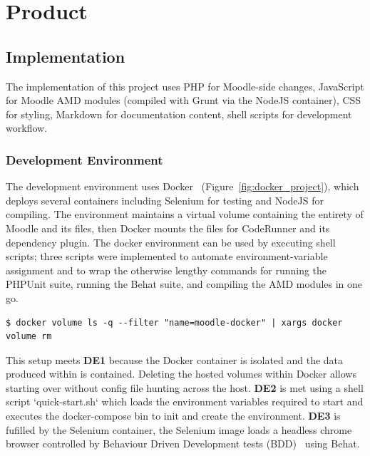 \section{Product}\label{product}

\subsection{Implementation}

The implementation of this project uses PHP for Moodle-side changes, JavaScript for Moodle AMD modules (compiled with Grunt via the NodeJS container), CSS for styling, Markdown for documentation content, shell scripts for development workflow.

\subsubsection{Development Environment}
The development environment uses Docker~\cite{dockerjournal} (Figure~\ref{fig:docker_project}), which deploys several containers including Selenium for testing and NodeJS for compiling. The environment maintains a virtual volume containing the entirety of Moodle and its files, then Docker mounts the files for CodeRunner and its dependency plugin. The docker environment can be used by executing shell scripts; three scripts were implemented to automate environment-variable assignment and to wrap the otherwise lengthy commands for running the PHPUnit suite, running the Behat suite, and compiling the AMD modules in one go.


\begin{lstlisting}[style=shellcmd]
$ docker volume ls -q --filter "name=moodle-docker" | xargs docker volume rm
\end{lstlisting}

This setup meets \textbf{DE1} because the Docker container is isolated and the data produced within is contained. Deleting the hosted volumes within Docker allows starting over without config file hunting across the host.
\textbf{DE2} is met using a shell script `quick-start.sh` which loads the environment variables required to start and executes the docker-compose bin to init and create the environment.
\textbf{DE3} is fufilled by the Selenium container, the Selenium image loads a headless chrome browser controlled by Behaviour Driven Development tests (BDD)~\cite{northbdd} using Behat.

